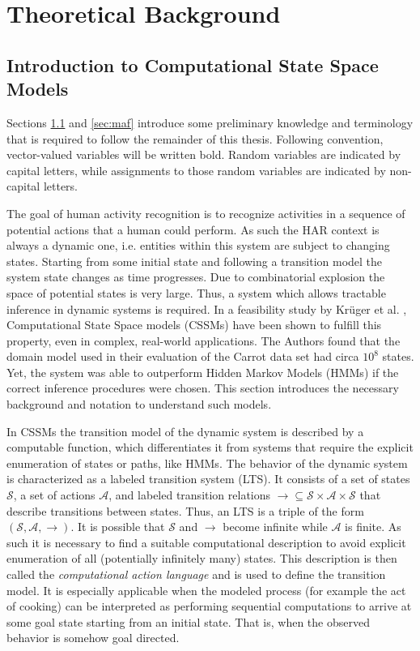 \documentclass[11pt,titlepage,oneside,openany]{book}
\begin{document}
\chapter{Theoretical Background}
\label{cha:theory}

\section{Introduction to Computational State Space Models}
\label{sec:cssm}
Sections \ref{sec:cssm} and \ref{sec:maf} introduce some preliminary knowledge and terminology that is required to follow the remainder  of this thesis. Following convention, vector-valued variables will be written bold. Random variables are indicated by capital letters, while assignments to those random variables are indicated by non-capital letters.

The goal of human activity recognition is to recognize activities in a sequence of potential actions that a human could perform. As such the HAR context is always a dynamic one, i.e. entities within this system are subject to changing states. Starting from some initial state and following a transition model the system state changes as time progresses. Due to combinatorial explosion the space of potential states is very large. Thus, a system which allows tractable inference in dynamic systems is required. In a feasibility study by Kr\"uger et al.  \cite{kruger_computational_2014}, Computational State Space models (CSSMs) have been shown to fulfill this property, even in complex, real-world applications. The Authors found that the domain model used in their evaluation of the Carrot data set had circa $10^8$ states. Yet, the system was able to outperform Hidden Markov Models (HMMs) if the correct inference procedures were chosen. This section introduces the necessary background and notation to understand such models.

In CSSMs the transition model of the dynamic system is described by a computable function, which differentiates it from systems that require the explicit enumeration of states or paths, like HMMs. The behavior of the dynamic system is characterized as a labeled transition system (LTS). It consists of a set of states $\mathcal{S}$, a set of actions $\mathcal{A}$, and labeled transition relations $\rightarrow \subseteq \mathcal{S} \times \mathcal{A} \times \mathcal{S}$ that describe transitions between states. Thus, an LTS is a triple of the form $(\mathcal{S}, \mathcal{A}, \rightarrow)$. It is possible that $\mathcal{S}$ and $\rightarrow$ become infinite while $\mathcal{A}$ is finite. As such it is necessary to find a suitable computational description to avoid explicit enumeration of all (potentially infinitely many) states. This description is then called the \emph{computational action language} and is used to define the transition model. It is especially applicable when the modeled process (for example the act of cooking) can be interpreted as performing sequential computations to arrive at some goal state starting from an initial state. That is, when the observed behavior is somehow goal directed.
\end{document}
